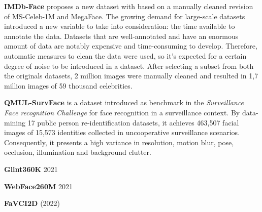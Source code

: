 \documentclass[class=report, crop=false, a4paper, 12pt]{standalone}
\begin{document}


\vspace{0.7\baselineskip}
\noindent\textbf{IMDb-Face} \autocite{wangDevilFaceRecognition2018} proposes a new dataset with based on a manually cleaned revision of MS-Celeb-1M and MegaFace. The growing demand for large-scale datasets introduced a new variable to take into consideration: the time available to annotate the data. Datasets that are well-annotated and have an enormous amount of data are notably expensive and time-consuming to develop. Therefore, automatic measures to clean the data were used, so it's expected for a certain degree of noise to be introduced in a dataset. After selecting a subset from both the originals datasets, 2 million images were manually cleaned and resulted in 1,7 million images of 59 thousand celebrities.

\vspace{0.7\baselineskip}
\noindent\textbf{QMUL-SurvFace} \autocite{chengSurveillanceFaceRecognition2018} is a dataset introduced as benchmark in the \textit{Surveillance Face recognition Challenge} for face recognition in a surveillance context. By data-mining 17 public person re-identification datasets, it achieves 463,507 facial images of 15,573 identities collected in uncooperative surveillance scenarios. Consequently, it presents a high variance in resolution, motion blur, pose, occlusion, illumination and background clutter.

\vspace{0.7\baselineskip}
\noindent\textbf{Glint360K} 2021

\vspace{0.7\baselineskip}
\noindent\textbf{WebFace260M} 2021

\vspace{0.7\baselineskip}
\noindent\textbf{FaVCI2D} (2022)
\end{document}
